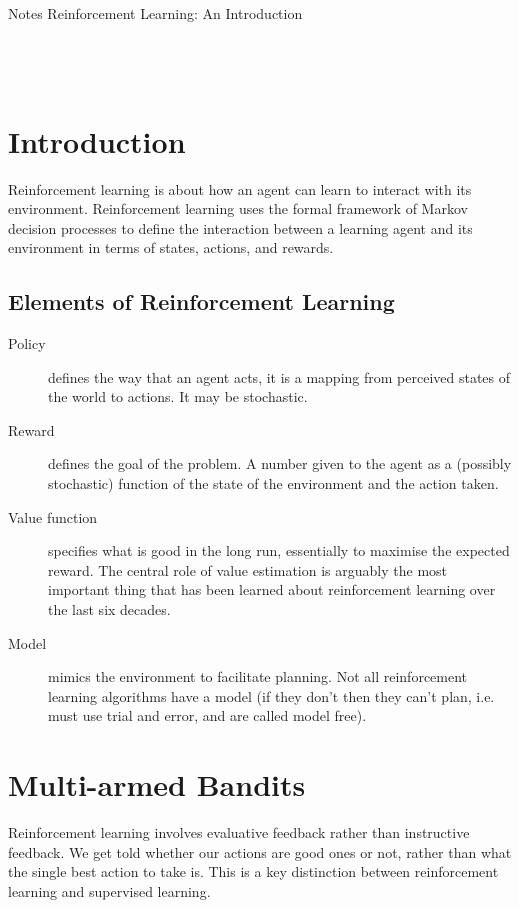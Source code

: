 \documentclass[a4paper, oneside, 11pt]{article}
\newcommand\Rule{\noindent\makebox[\textwidth]{\rule{\textwidth}{0.5pt}}}
\begin{document}
{\huge Notes} \hfill {\huge Reinforcement Learning: An Introduction}\\
\Rule\\
\tableofcontents
\mbox{}\\
\Rule
\mbox{}\\


\clearpage
\section{Introduction}
Reinforcement learning is about how an agent can learn to interact with its environment. Reinforcement learning uses the formal framework of Markov decision processes to define the interaction between a learning agent and its environment in terms of states, actions, and rewards.

\setcounter{subsection}{2}
\subsection{Elements of Reinforcement Learning}
\begin{description}
     \item[Policy] defines the way that an agent acts, it is a mapping from perceived states of the world to actions. It may be stochastic.
     \item[Reward] defines the goal of the problem. A number given to the agent as a (possibly stochastic) function of the state of the environment and the action taken.
     \item[Value function] specifies what is good in the long run, essentially to maximise the expected reward. The central role of value estimation is arguably the most important thing that has been learned about reinforcement learning over the last six decades.
     \item[Model] mimics the environment to facilitate planning. Not all reinforcement learning algorithms have a model (if they don't then they can't plan, i.e. must use trial and error, and are called model free).
\end{description}


\section{Multi-armed Bandits}
Reinforcement learning involves evaluative feedback rather than instructive feedback. We get told whether our actions are good ones or not, rather than what the single best action to take is. This is a key distinction between reinforcement learning and supervised learning.
\end{document}
